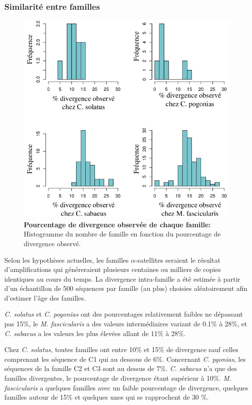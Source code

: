 \documentclass[12pt,a4paper]{article}
\begin{document}
			\subsubsection{Similarité entre familles}
\begin{figure}	
	\center
	\includegraphics[scale=0.4]{img/hist_similarity.png}
	\caption{\textbf{Pourcentage de divergence observée de chaque famille:} Histogramme du nombre de famille en fonction du pourcentage de divergence observé. 
	\label{fig:divergence}
		} 
\end{figure}

	Selon les hypothèses actuelles, les familles $\alpha$-satellites seraient le résultat d'amplifications qui généreraient plusieurs centaines ou milliers de copies identiques au cours du temps. La divergence intra-famille a été estimée à partir d'un échantillon de 500 séquences par famille (au plus) choisies aléatoirement afin d'estimer l'âge des familles. 
	
	\textit{C. solatus} et \textit{C. pogonias} ont des pourcentages relativement faibles ne dépassant pas 15\%, le \textit{M. fascicularis} a des valeurs intermédiaires variant de 0.1\% à 28\%, et \textit{C. sabaeus} a les valeurs les plus élevées allant de 11\% à 28\%.	
	
	Chez \textit{C. solatus}, toutes familles ont entre 10\% et 15\% de divergence sauf celles comprenant les séquence de C1 qui au dessous de 6\%. Concernant \textit{C. pgonias}, les séquences de la famille C2 et C3 sont au dessus de 7\%. \textit{C. sabaeus} n'a que des familles divergentes, le pourcentage de divergence étant supérieur à 10\%. \textit{M. fascicularis} a quelques familles avec un faible pourcentage de divergence, quelques familles autour de 15\% et quelques unes qui se rapprochent de 30 \%. 
	
\end{document}
